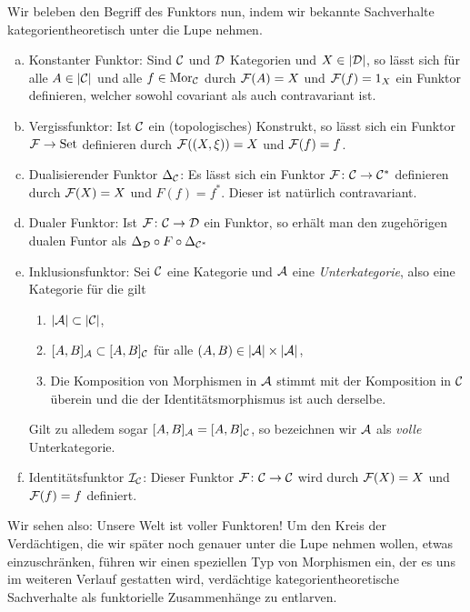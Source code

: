 Wir beleben den Begriff des Funktors nun, indem wir bekannte Sachverhalte kategorientheoretisch unter die Lupe nehmen.

\begin{ex}
  \label{ex:Example}
\begin{enumerate}[a)]
    \item Konstanter Funktor: Sind $\mathcal{C}$ und $\mathcal{D}$ Kategorien und $X \in |\mathcal{D}|$, so lässt sich für alle $A \in |\mathcal{C}|$ und alle $f \in \mathrm{Mor}_{\mathcal{C}}$ durch $\mathcal{F}(A) = X$ und $\mathcal{F}(f) = 1_X$ ein Funktor definieren, welcher sowohl covariant als auch contravariant ist.
    \item Vergissfunktor: Ist $\mathcal{C}$ ein (topologisches) Konstrukt, so lässt sich ein Funktor $\mathcal{F} \to \mathrm{Set}$ definieren durch $\mathcal{F}((X, \xi)) = X$ und $\mathcal{F}(f) = f$.
    \item Dualisierender Funktor $\Delta_{\mathcal{C}}$: Es lässt sich ein Funktor $\mathcal{F} \colon \mathcal{C} \to \mathcal{C}^*$ definieren durch $\mathcal{F}(X) = X$ und $F(f) = f^*$. Dieser ist natürlich contravariant.
    \item Dualer Funktor: Ist $\mathcal{F} \colon \mathcal{C} \to \mathcal{D}$ ein Funktor, so erhält man den zugehörigen dualen Funtor als $\Delta_{\mathcal{D}} \circ F \circ \Delta_{\mathcal{C}^*}$
    \item Inklusionsfunktor: Sei $\mathcal{C}$ eine Kategorie und $\mathcal{A}$ eine \emph{Unterkategorie}, also eine Kategorie für die gilt
      \begin{enumerate}
        \item $|\mathcal{A}| \subset |\mathcal{C}|$,
        \item $[A, B]_{\mathcal{A}} \subset [A,B]_{\mathcal{C}}$ für alle $(A, B) \in |\mathcal{A}| \times |\mathcal{A}|$,
        \item Die Komposition von Morphismen in $\mathcal{A}$ stimmt mit der Komposition in $\mathcal{C}$ überein und die der Identitätsmorphismus ist auch derselbe.
      \end{enumerate}
      Gilt zu alledem sogar $[A, B]_{\mathcal{A}} = [A, B]_{\mathcal{C}}$, so bezeichnen wir $\mathcal{A}$ als \emph{volle} Unterkategorie.
    \item Identitätsfunktor $\mathcal{I}_{\mathcal{C}}$: Dieser Funktor $\mathcal{F} \colon \mathcal{C} \to \mathcal{C}$ wird durch $\mathcal{F}(X) = X$ und $\mathcal{F}(f) = f$ definiert.
  \end{enumerate}
\end{ex}

Wir sehen also: Unsere Welt ist voller Funktoren! Um den Kreis der Verdächtigen, die wir später noch genauer unter die Lupe nehmen wollen, etwas einzuschränken, führen wir einen speziellen Typ von Morphismen ein, der es uns im weiteren Verlauf gestatten wird, verdächtige kategorientheoretische Sachverhalte als funktorielle Zusammenhänge zu entlarven.

